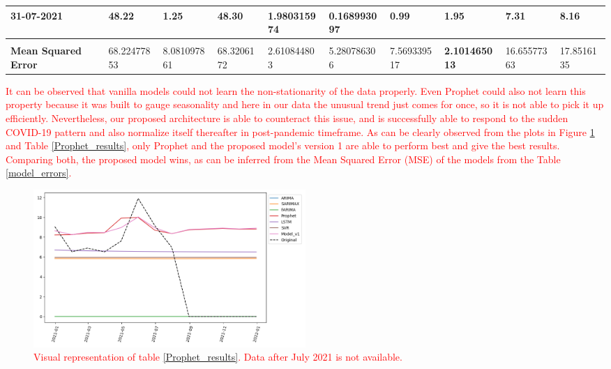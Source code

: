 \documentclass[times,twocolumn,final,authoryear]{elsarticle}
\begin{document}
\begin{table}
{\begin{tabular}{|l|l|l|l|l|l|l|l|l|l|}
				31-07-2021                  & 48.22                 & 1.25                    & 48.30                  & 1.980315974             & 0.168993097          & 0.99                & 1.95                 & 7.31               & 8.16               \\ \hline
				&                       &                         &                        &                         &                      &                     &                      &                    &                    \\ \hline
				\textbf{Mean Squared Error} & 68.22477853           & 8.081097861             & 68.3206172             & 2.610844803             & 5.280786306          & 7.569339517         & \textbf{2.101465013} & 16.65577363        & 17.8516135         \\ \hline
			\end{tabular}%
		}
	\end{table}
	
	
	\textcolor{red}{It can be observed that vanilla models could not learn the non-stationarity of the data properly. Even Prophet could also not learn this property because it was built to gauge seasonality and here in our data the unusual trend just comes for once, so it is not able to pick it up efficiently. Nevertheless, our proposed architecture is able to counteract this issue, and is successfully able to respond to the sudden COVID-19 pattern and also normalize itself thereafter in post-pandemic timeframe. As can be clearly observed from the plots in Figure \ref{Model_res} and Table \ref{Prophet_results}, only Prophet and the proposed model's version 1 are able to perform best and give the best results. Comparing both, the proposed model wins, as can be inferred from the Mean Squared Error (MSE) of the models from the Table \ref{model_errors}.}
	

	\begin{figure}[!t]
		\centering
		\includegraphics[width=0.5\textwidth]{Figures/Model_results.png}
		\caption{\textcolor{red}{Visual representation of table \ref{Prophet_results}. Data after July 2021 is not available.}}
		\label{Model_res}
	\end{figure}
\end{document}
